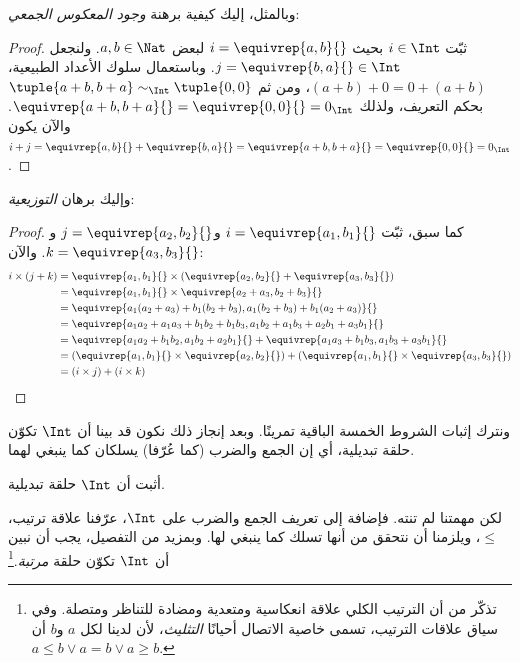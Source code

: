 \documentclass[../../../include/open-logic-section]{subfiles}
\begin{document}
وبالمثل، إليك كيفية برهنة \emph{وجود المعكوس الجمعي}:

\begin{proof}
ثبّت $i \in \Int$ بحيث $i = \equivrep{a,b}{}$ لبعض $a,b \in
\Nat$. ولنجعل $j = \equivrep{b,a}{} \in \Int$. وباستعمال سلوك
الأعداد الطبيعية، $(a+b) + 0 = 0 + (a+b)$، ومن ثم
$\tuple{a+b, b+a} \sim_\Int \tuple{0,0}$ بحكم التعريف، ولذلك
$\equivrep{a+b, b+a}{} = \equivrep{0, 0}{} = 0_\Int$. والآن يكون $i + j =
\equivrep{a,b}{}+\equivrep{b,a}{}=\equivrep{a+b, b+a}{}= \equivrep{0,
0}{} = 0_\Int$.
\end{proof}

وإليك برهان \emph{التوزيعية}:

\begin{proof}
كما سبق، ثبّت $i = \equivrep{a_1, b_1}{}$ و$j =
\equivrep{a_2,b_2}{}$ و$k = \equivrep{a_3, b_3}{}$. والآن:
\begin{align*}
	i \times (j + k) 
	&= \equivrep{a_1, b_1}{} \times (\equivrep{a_2,b_2}{} + \equivrep{a_3, b_3}{})\\
	&= \equivrep{a_1, b_1}{} \times \equivrep{a_2 + a_3,b_2+b_3}{}\\
	&= \equivrep{a_1  (a_2 + a_3) + b_1  (b_2+b_3), a_1  (b_2 + b_3) + b_1 (a_2 + a_3)}{}\\
	&= \equivrep{a_1 a_2 + a_1a_3 + b_1 b_2+b_1b_3, a_1 b_2 + a_1b_3 + a_2b_1 + a_3b_1}{}\\		
	&= \equivrep{a_1a_2 + b_1b_2, a_1b_2 + a_2b_1}{} + \equivrep{a_1a_3 + b_1b_3, a_1b_3 + a_3b_1}{}\\
	&= (\equivrep{a_1, b_1}{} \times \equivrep{a_2,b_2}{}) + (\equivrep{a_1, b_1}{} \times  \equivrep{a_3, b_3}{})\\
	&= (i \times j) + (i \times k)
\end{align*}
\end{proof}

ونترك إثبات الشروط الخمسة الباقية تمرينًا. وبعد إنجاز ذلك نكون قد بينا
أن $\Int$ تكوّن حلقة تبديلية، أي إن الجمع والضرب (كما عُرّفا) يسلكان
كما ينبغي لهما.

\begin{prob}
أثبت أن $\Int$ حلقة تبديلية.
\end{prob}

لكن مهمتنا لم تنته. فإضافة إلى تعريف الجمع والضرب على $\Int$، عرّفنا
علاقة ترتيب، $\leq$، ويلزمنا أن نتحقق من أنها تسلك كما ينبغي لها.
وبمزيد من التفصيل، يجب أن نبين أن $\Int$ تكوّن حلقة
\emph{مرتبة}.\footnote{تذكّر من
	 أن الترتيب الكلي علاقة
	انعكاسية ومتعدية ومضادة للتناظر ومتصلة.
	وفي سياق علاقات الترتيب، تسمى خاصية الاتصال أحيانًا
	\emph{التثليث}، لأن لدينا لكل $a$ و$b$ أن $a \leq b \lor a
	= b \lor a \geq b$.}
\end{document}
